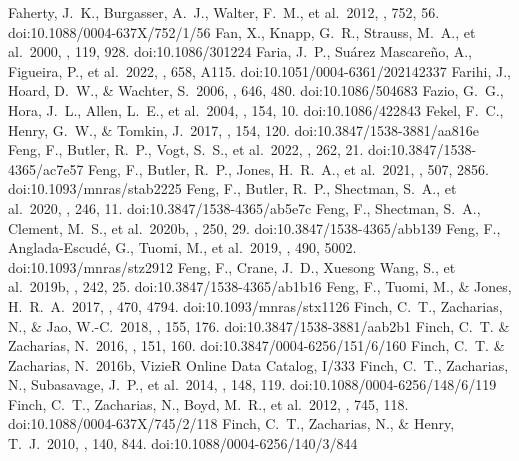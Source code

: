\documentclass[twocolumn,tighten,twocolappendix]{aastex631}
\begin{document}
\begin{thebibliography}{}
 Faherty, J.~K., Burgasser, A.~J., Walter, F.~M., et al.\ 2012, \apj, 752, 56. doi:10.1088/0004-637X/752/1/56
 Fan, X., Knapp, G.~R., Strauss, M.~A., et al.\ 2000, \aj, 119, 928. doi:10.1086/301224
 Faria, J.~P., Su{\'a}rez Mascare{\~n}o, A., Figueira, P., et al.\ 2022, \aap, 658, A115. doi:10.1051/0004-6361/202142337
 Farihi, J., Hoard, D.~W., \& Wachter, S.\ 2006, \apj, 646, 480. doi:10.1086/504683
 Fazio, G.~G., Hora, J.~L., Allen, L.~E., et al.\ 2004, \apjs, 154, 10. doi:10.1086/422843
 Fekel, F.~C., Henry, G.~W., \& Tomkin, J.\ 2017, \aj, 154, 120. doi:10.3847/1538-3881/aa816e
 Feng, F., Butler, R.~P., Vogt, S.~S., et al.\ 2022, \apjs, 262, 21. doi:10.3847/1538-4365/ac7e57
 Feng, F., Butler, R.~P., Jones, H.~R.~A., et al.\ 2021, \mnras, 507, 2856. doi:10.1093/mnras/stab2225
 Feng, F., Butler, R.~P., Shectman, S.~A., et al.\ 2020, \apjs, 246, 11. doi:10.3847/1538-4365/ab5e7c
 Feng, F., Shectman, S.~A., Clement, M.~S., et al.\ 2020b, \apjs, 250, 29. doi:10.3847/1538-4365/abb139
 Feng, F., Anglada-Escud{\'e}, G., Tuomi, M., et al.\ 2019, \mnras, 490, 5002. doi:10.1093/mnras/stz2912
 Feng, F., Crane, J.~D., Xuesong Wang, S., et al.\ 2019b, \apjs, 242, 25. doi:10.3847/1538-4365/ab1b16
 Feng, F., Tuomi, M., \& Jones, H.~R.~A.\ 2017, \mnras, 470, 4794. doi:10.1093/mnras/stx1126
 Finch, C.~T., Zacharias, N., \& Jao, W.-C.\ 2018, \aj, 155, 176. doi:10.3847/1538-3881/aab2b1
 Finch, C.~T. \& Zacharias, N.\ 2016, \aj, 151, 160. doi:10.3847/0004-6256/151/6/160
 Finch, C.~T. \& Zacharias, N.\ 2016b, VizieR Online Data Catalog, I/333
 Finch, C.~T., Zacharias, N., Subasavage, J.~P., et al.\ 2014, \aj, 148, 119. doi:10.1088/0004-6256/148/6/119
 Finch, C.~T., Zacharias, N., Boyd, M.~R., et al.\ 2012, \apj, 745, 118. doi:10.1088/0004-637X/745/2/118
 Finch, C.~T., Zacharias, N., \& Henry, T.~J.\ 2010, \aj, 140, 844. doi:10.1088/0004-6256/140/3/844

\end{thebibliography}
\end{document}
